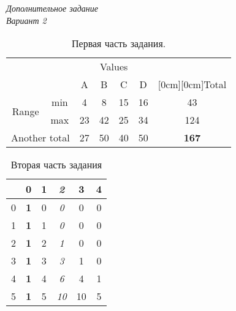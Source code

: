 \vspace*{1mm}
\begin{center}
	{\large \textit{Дополнительное задание}} \\
	\textit{Вариант 2}
\end{center}

\begin{table}[h]	
	\caption{Первая часть задания.}
	\begin{center}
		\begin{tabular}{|*{7}{c|}} \cline{3-7}
			\multicolumn{2}{c|}{} & \multicolumn{4}{c|}{Values} & \\ \cline{3-6}
			\multicolumn{2}{c|}{} & A & B & C & D & \raisebox{1.5ex}[0cm][0cm]{Total}\\
			\cline{1-7}
			\multirow{2}{*}{Range} & min & 4 & 8 & 15 & 16 & 43 \\ \cline{2-7}
			 & max & 23 & 42 & 25 & 34 & 124 \\ \hline
			\multicolumn{2}{|c|}{Another total} & 27 & 50 & 40 & 50 & \textbf{167} \\
			\hline
		\end{tabular}
	\end{center}
\end{table}

\begin{table}[h]
	\caption{Вторая часть задания}
	\begin{center}
		\begin{tabular}{*{5}{c|}c}
			\diagbox{n}{k} & \textbf{0} & 1 & \textit{2} & 3 & 4 \\ \hline
			0 & \textbf{1} & 0 & \textit{0} & 0 & 0 \\ \hline
			1 & \textbf{1} & 1 & \textit{0} & 0 & 0 \\ \hline
			2 & \textbf{1} & 2 & \textit{1} & 0 & 0 \\ \hline
			3 & \textbf{1} & 3 & \textit{3} & 1 & 0 \\ \hline
			4 & \textbf{1} & 4 & \textit{6} & 4 & 1 \\ \hline
			5 & \textbf{1} & 5 & \textit{10} & 10 & 5 \\
		\end{tabular}
	\end{center}
\end{table}



